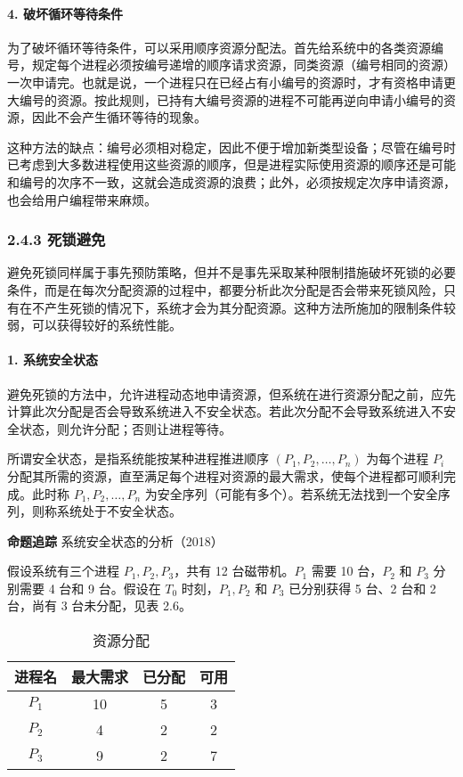 \documentclass{ctexbook}
\begin{document}
	\paragraph{4. 破坏循环等待条件}
	
	为了破坏循环等待条件，可以采用顺序资源分配法。首先给系统中的各类资源编号，规定每个进程必须按编号递增的顺序请求资源，同类资源（编号相同的资源）一次申请完。也就是说，一个进程只在已经占有小编号的资源时，才有资格申请更大编号的资源。按此规则，已持有大编号资源的进程不可能再逆向申请小编号的资源，因此不会产生循环等待的现象。
	
	这种方法的缺点：编号必须相对稳定，因此不便于增加新类型设备；尽管在编号时已考虑到大多数进程使用这些资源的顺序，但是进程实际使用资源的顺序还是可能和编号的次序不一致，这就会造成资源的浪费；此外，必须按规定次序申请资源，也会给用户编程带来麻烦。
	
	\subsubsection{2.4.3 死锁避免}
	
	避免死锁同样属于事先预防策略，但并不是事先采取某种限制措施破坏死锁的必要条件，而是在每次分配资源的过程中，都要分析此次分配是否会带来死锁风险，只有在不产生死锁的情况下，系统才会为其分配资源。这种方法所施加的限制条件较弱，可以获得较好的系统性能。
	
	\paragraph{1. 系统安全状态}
	
	避免死锁的方法中，允许进程动态地申请资源，但系统在进行资源分配之前，应先计算此次分配是否会导致系统进入不安全状态。若此次分配不会导致系统进入不安全状态，则允许分配；否则让进程等待。
	
	所谓安全状态，是指系统能按某种进程推进顺序 $(P_1, P_2, \dots, P_n)$ 为每个进程 $P_i$ 分配其所需的资源，直至满足每个进程对资源的最大需求，使每个进程都可顺利完成。此时称 $P_1, P_2, \dots, P_n$ 为安全序列（可能有多个）。若系统无法找到一个安全序列，则称系统处于不安全状态。
	
	\textbf{命题追踪} 系统安全状态的分析（2018）
	
	假设系统有三个进程 $P_1, P_2, P_3$，共有 12 台磁带机。$P_1$ 需要 10 台，$P_2$ 和 $P_3$ 分别需要 4 台和 9 台。假设在 $T_0$ 时刻，$P_1, P_2$ 和 $P_3$ 已分别获得 5 台、2 台和 2 台，尚有 3 台未分配，见表 2.6。
	
	\begin{table}[h]
		\centering
		\caption{资源分配}
		\label{tab:resource_allocation}
		\begin{tabular}{|c|c|c|c|}
			\hline
			进程名 & 最大需求 & 已分配 & 可用 \\
			\hline
			$P_1$ & 10 & 5 & 3 \\
			\hline
			$P_2$ & 4 & 2 & 2 \\
			\hline
			$P_3$ & 9 & 2 & 7 \\
			\hline
		\end{tabular}
	\end{table}
	
\end{document}
